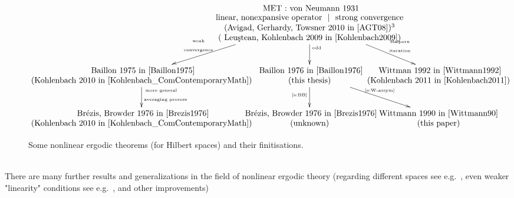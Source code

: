 \begin{figure}[htb]%
\[
\begin{xy}
  \xymatrix@C=-50pt@M=3pt{
  		  & \txt{ MET : von Neumann  1931 \\ linear, nonexpansive operator $\ |\ $ strong convergence\\(Avigad, Gerhardy, Towsner 2010 in~\cite{AGT08})\footnotemark\\ ( Leu{\c{s}}tean, Kohlenbach 2009 in~\cite{Kohlenbach2009})
 		  } \ar[dl]_-{\txt{\tiny weak\\\tiny convergence}} \ar[d]^{\txt{\tiny odd}} \ar[dr]^-{\txt{\tiny $ $\hspace{2ex} Halpern\\ \tiny $ $\hspace{2ex} iteration}} &  \\
        \txt{ 					Baillon 1975 in~\cite{Baillon1975} \\ (Kohlenbach 2010 in~\cite{Kohlenbach_ComContemporaryMath})} \ar[d]^{\txt{\tiny more general\hspace{5ex}$ $\\ \vspace{-7pt}\tiny averaging process}} &  
        \txt{ Baillon 1976 in~\cite{Baillon1976} \\ (this thesis) } \ar[d]_{\txt{\tiny \eqref{e:BB}}} \ar[dr]^{\txt{\tiny \eqref{e:W-assym}}} &  
        \txt{ Wittman 1992 in~\cite{Wittmann1992} \\ (Kohlenbach 2011 in~\cite{Kohlenbach2011})}        \\
         \txt{ Br\'ezis, Browder 1976 in~\cite{Brezis1976} \\ (Kohlenbach 2010 in~\cite{Kohlenbach_ComContemporaryMath}) }  & \txt{ Br\'ezis, Browder 1976 in~\cite{Brezis1976} \\ (unknown) } & \txt{Wittmann 1990 in~\cite{Wittmann90} \\ (this paper)} &   
   }
\end{xy}
\]
\caption{Some nonlinear ergodic theorems (for Hilbert spaces) and their finitisations.}%
\label{f:METtree}
\end{figure}
 \\					
There are many further results and generalizations
in the field of nonlinear ergodic theory 
(regarding different spaces see e.g.~\cite{Bruck1979,Hirano1982}, even weaker "linearity" conditions see e.g.~\cite{Miyadera1997,Rouhani2001}, and other improvements) 
